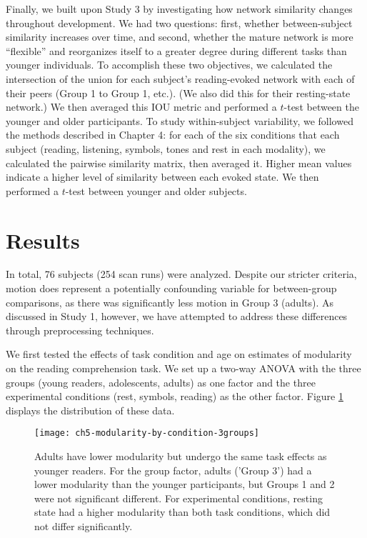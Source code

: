 Finally, we built upon Study 3 by investigating how network similarity changes throughout development. We had two questions: first, whether between-subject similarity increases over time, and second, whether the mature network is more ``flexible'' and reorganizes itself to a greater degree during different tasks than younger individuals. To accomplish these two objectives, we calculated the intersection of the union for each subject's reading-evoked network with each of their peers (Group 1 to Group 1, etc.). (We also did this for their resting-state network.) We then averaged this IOU metric and performed a $t$-test between the younger and older participants. To study within-subject variability, we followed the methods described in Chapter 4: for each of the six conditions that each subject (reading, listening, symbols, tones and rest in each modality), we calculated the pairwise similarity matrix, then averaged it. Higher mean values indicate a higher level of similarity between each evoked state. We then performed a $t$-test between younger and older subjects.


\section{Results}

In total, 76 subjects (254 scan runs) were analyzed. Despite our stricter criteria, motion does represent a potentially confounding variable for between-group comparisons, as there was significantly less motion in Group 3 (adults). As discussed in Study 1, however, we have attempted to address these differences through preprocessing techniques.

We first tested the effects of task condition and age on estimates of modularity on the reading comprehension task. We set up a two-way ANOVA with the three groups (young readers, adolescents, adults) as one factor and the three experimental conditions (rest, symbols, reading) as the other factor. Figure \ref{fig:ch5-modularity-by-condition-3groups} displays the distribution of these data. 

\begin{figure}[t]
	\centering
	\texttt{[image: ch5-modularity-by-condition-3groups]}
    \caption[Adults have lower modularity but undergo the same task effects as younger readers]{Adults have lower modularity but undergo the same task effects as younger readers. For the group factor, adults ('Group 3') had a lower modularity than the younger participants, but Groups 1 and 2 were not significant different. For experimental conditions, resting state had a higher modularity than both task conditions, which did not differ significantly.}
	\label{fig:ch5-modularity-by-condition-3groups}
\end{figure}

